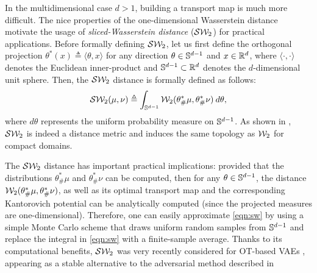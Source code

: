 In the multidimensional case $d > 1$, building a transport map is much more difficult. The nice properties of the one-dimensional Wasserstein distance motivate the usage of \emph{sliced-Wasserstein distance} (${\cal S}{\cal W}_2$) for practical applications. Before formally defining ${\cal S}{\cal W}_2$, let us first define the orthogonal projection $\theta^* (x) \triangleq \langle \theta, x \rangle$ for any direction $\theta \in \mathbb{S}^{d-1}$ and $x \in \mathbb{R}^d$, where $\langle \cdot, \cdot \rangle$ denotes the Euclidean inner-product and $\mathbb{S}^{d-1} \subset \mathbb{R}^d$ denotes the $d$-dimensional unit sphere. Then, the ${\cal S}{\cal W}_2$ distance is formally defined as follows:
\begin{align}
{\cal S}{\cal W}_2(\mu,\nu) \triangleq \int_{\mathbb{S}^{d-1}} {\cal W}_2 (\theta^*_\#\mu, \theta^*_\#\nu) \> d \theta, \label{eqn:sw}
\end{align}
where $d\theta$ represents the uniform probability measure on $\mathbb{S}^{d-1}$. As shown in \cite{bonnotte2013unidimensional}, ${\cal S}{\cal W}_2$ is indeed a distance metric and induces the same topology as ${\cal W}_2$ for compact domains.

The ${\cal S}{\cal W}_2$ distance has important practical implications: provided that the distributions $\theta^*_\#\mu$ and $\theta^*_\#\nu$ can be computed, then for any $\theta \in \mathbb{S}^{d-1}$, the distance ${\cal W}_2 (\theta^*_\#\mu, \theta^*_\#\nu)$, as well as its optimal transport map and the corresponding Kantorovich potential can be analytically computed (since the projected measures are one-dimensional). Therefore, one can easily approximate \eqref{eqn:sw} by using a simple Monte Carlo scheme that draws uniform random samples from $\mathbb{S}^{d-1}$ and replace the integral in \eqref{eqn:sw} with a finite-sample average. Thanks to its computational benefits, ${\cal S}{\cal W}_2$ was very recently considered for OT-based VAEs \cite{kolouri2018sliced}, appearing as a stable alternative to the adversarial method described in~\cite{makhzani2015adversarial}

